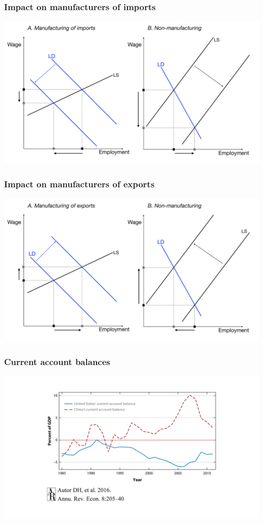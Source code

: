 \documentclass[notes=show]{beamer}
\begin{document}
\begin{frame}
\frametitle{Impact on manufacturers of imports}
\begin{center}
\includegraphics[width=\textwidth]{fig-model-1.pdf}%
\end{center}
\end{frame}

\begin{frame}
\frametitle{Impact on manufacturers of exports}
\begin{center}
\includegraphics[width=\textwidth]{fig-model-2.pdf}%
\end{center}
\end{frame}

\begin{frame}
\frametitle{Current account balances}
\begin{center}
\includegraphics[width=\textwidth]{AR-fig-5.pdf}%
\end{center}
\end{frame}
\end{document}
